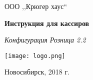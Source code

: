 \begin{titlepage}
\begin{center}
\large
ООО  ,,Крюгер хаус``


\vspace{2.25cm}

\textbf{Инструкция для кассиров } 

\textit{Конфигурация Розница 2.2}
\vfill    

{\texttt{[image: logo.png]}}  

\end{center}
\vfill

\newlength{\ML}


\begin{center}
Новосибирск, 2018 г.
\end{center}
\end{titlepage}